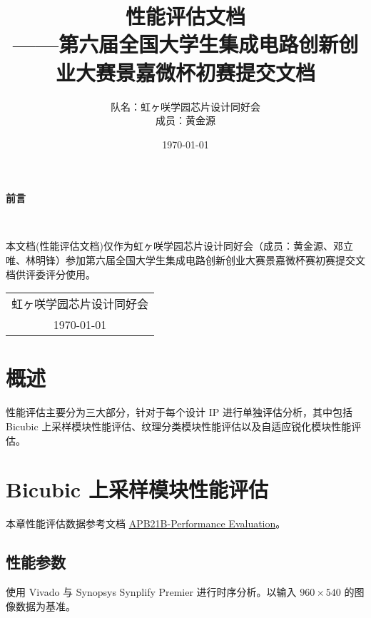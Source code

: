 \documentclass[12pt, a4paper, oneside]{ctexbook}
\title{{\Huge{\textbf{性能评估文档}}}\normalsize{\\——第六届全国大学生集成电路创新创业大赛景嘉微杯初赛提交文档}}
\author{队名：虹ヶ咲学园芯片设计同好会\\ 成员：黄金源\space邓立唯\space林明锋}
\date{\today}
\begin{document}
	
	\maketitle	
	\setcounter{page}{1}
	\begin{center}
		\Huge\textbf{前言}
	\end{center}~\
	
	本文档(性能评估文档)仅作为虹ヶ咲学园芯片设计同好会（成员：黄金源、邓立唯、林明锋）参加第六届全国大学生集成电路创新创业大赛景嘉微杯赛初赛提交文档供评委评分使用。
	~\\
	\begin{flushright}
		\begin{tabular}{c}
			虹ヶ咲学园芯片设计同好会\\
			\today
		\end{tabular}
	\end{flushright}
	\newpage
	\setcounter{page}{1}
	\tableofcontents
	\newpage
	\setcounter{page}{1}
	
	\chapter{概述}
	性能评估主要分为三大部分，针对于每个设计 IP 进行单独评估分析，其中包括 Bicubic 上采样模块性能评估、纹理分类模块性能评估以及自适应锐化模块性能评估。
	
	\chapter{Bicubic 上采样模块性能评估}
	本章性能评估数据参考文档 \href{./ref/APV21B_Performance_Evaluation.pdf}{APB21B-Performance Evaluation}。
	\section{性能参数}
	使用 Vivado 与 Synopsys Synplify Premier 进行时序分析。以输入 $960\times540$ 的图像数据为基准。
\end{document}
